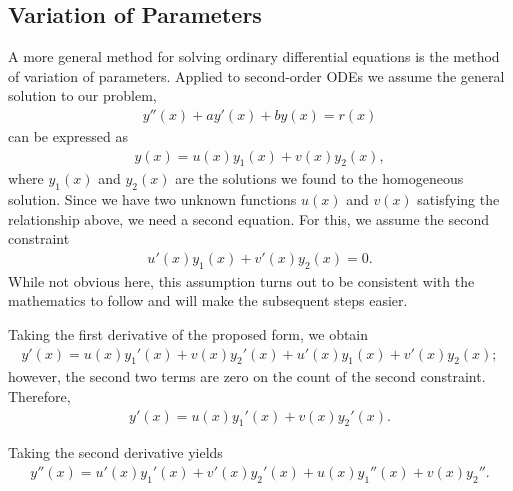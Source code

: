 \subsection{Variation of Parameters}

A more general method for solving ordinary differential equations is the method of variation of parameters. Applied to second-order ODEs we assume the general solution to our problem,
\begin{align}
  y''(x) + a y'(x) + b y(x) = r(x) \nonumber
\end{align}
can be expressed as
\begin{align}
  y(x) = u(x) y_1(x) + v(x) y_2(x),
\end{align}
where $y_1(x)$ and $y_2(x)$ are the solutions we found to the homogeneous solution. Since we have two unknown functions $u(x)$ and $v(x)$ satisfying the relationship above, we need a second equation. For this, we assume the second constraint
\begin{align}
  u'(x) y_1(x) + v'(x) y_2(x) = 0.
\end{align}
While not obvious here, this assumption turns out to be consistent with the mathematics to follow and will make the subsequent steps easier.

Taking the first derivative of the proposed form, we obtain
\begin{align}
  y'(x) = u(x) y_1'(x) + v(x) y_2'(x) + u'(x) y_1(x) + v'(x) y_2(x); \nonumber
\end{align}
however, the second two terms are zero on the count of the second constraint. Therefore,
\begin{align}
  y'(x) = u(x) y_1'(x) + v(x) y_2'(x).
\end{align}

Taking the second derivative yields
\begin{align}
  y''(x) = u'(x) y_1'(x) + v'(x) y_2'(x) + u(x) y_1''(x) + v(x) y_2''.
\end{align}

